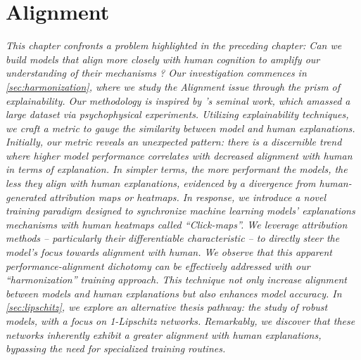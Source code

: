 \chapter{Alignment}
\label{chap:alignment}

\begin{chapterabstract}
\textit{
This chapter confronts a problem highlighted in the preceding chapter: Can we build models that align more closely with human cognition to amplify our understanding of their mechanisms ? 
Our investigation commences in \autoref{sec:harmonization}, where we study the Alignment issue through the prism of explainability. Our methodology is inspired by \cite{linsley2018learning}'s seminal work, which amassed a large dataset via psychophysical experiments. Utilizing explainability techniques, we craft a metric to gauge the similarity between model and human explanations. Initially, our metric reveals an unexpected pattern: there is a discernible trend where higher model performance correlates with decreased alignment with human in terms of explanation. In simpler terms, the more performant the models, the less they align with human explanations, evidenced by a divergence from human-generated attribution maps or heatmaps.
In response, we introduce a novel training paradigm designed to synchronize machine learning models' explanations mechanisms with human heatmaps called ``Click-maps''. We leverage attribution methods -- particularly their differentiable characteristic -- to directly steer the model's focus towards alignment with human. 
We observe that this apparent performance-alignment dichotomy can be effectively addressed with our ``harmonization'' training approach. This technique not only increase alignment between models and human explanations but also enhances model accuracy.
In \autoref{sec:lipschitz}, we explore an alternative thesis pathway: the study of robust models, with a focus on 1-Lipschitz networks. Remarkably, we discover that these networks inherently exhibit a greater alignment with human explanations, bypassing the need for specialized training routines.
}
\end{chapterabstract}

